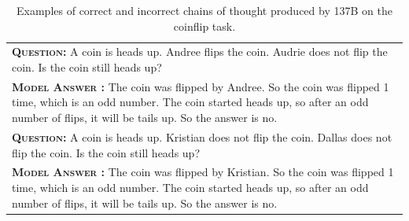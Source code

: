 \begingroup
\begin{table}[H]
    \caption{
    Examples of correct and incorrect chains of thought produced by \lamda{} 137B on the coinflip task.
    }
    \centering
    \small
    \begin{tabular}{p{\linewidth}}
        \toprule
        \vspace{-2mm}
        \textbf{\textsc{Question:}} A coin is heads up. Andree flips the coin. Audrie does not flip the coin. Is the coin still heads up?  \\
        \vspace{-1mm}
        \textbf{\textsc{Model Answer \color{darkGreen}{(CORRECT)}:}} The coin was flipped by Andree. So the coin was flipped 1 time, which is an odd number. The coin started heads up, so after an odd number of flips, it will be tails up. So the answer is no. \color{darkGreen}{\checkmark} \\
        \midrule
        \vspace{-2mm}
        \textbf{\textsc{Question:}} A coin is heads up. Kristian does not flip the coin. Dallas does not flip the coin. Is the coin still heads up? \\
        \vspace{-1mm}
        \textbf{\textsc{Model Answer \color{blue}{(INCORRECT)}:}} The coin {\color{blue} was flipped by Kristian}. So the coin was flipped 1 time, which is an odd number. The coin started heads up, so after an odd number of flips, it will be tails up. So the answer is no. \color{blue}{\xmark} \\
        \bottomrule
    \end{tabular}
    \label{tab:appendix-coinflip-examples}
\end{table}
\endgroup